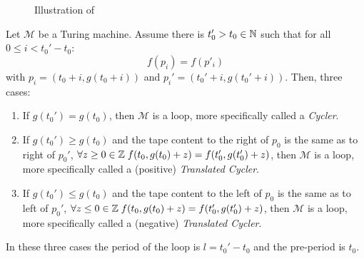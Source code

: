 \begin{figure}[h!]
\begin{minipage}[t]{0.5\textwidth}
{
        }
    \end{minipage}
    \caption{Illustration of}\label{fig:loop-proof}
\end{figure}

\begin{theorem} Let $\mathcal{M}$ be a Turing machine.
    Assume there is $t_0' > t_0 \in \mathbb{N}$ such that
    for all $0 \leq i < t_0'-t_0$: $$f(p_i) = f(p'_i)$$ with $p_i = (t_0+i, g(t_0+i))$ and $p_i' = (t_0'+i, g(t_0'+i))$. Then, three cases:
    \begin{enumerate}
        \item If $g(t_0') = g(t_0)$, then $\mathcal{M}$ is a loop, more specifically called a \textit{Cycler}.
        \item If $g(t_0') \geq g(t_0)$ and the tape content to the right of $p_0$ is the same as to right of $p_0'$, \ie $\forall z \geq 0 \in  \mathbb{Z} \; f(t_0,g(t_0)+z) = f(t_0',g(t_0')+z)$, then $\mathcal{M}$ is a loop, more specifically called a (positive) \textit{Translated Cycler}.
        \item If $g(t_0') \leq g(t_0)$ and the tape content to the left of $p_0$ is the same as to left of $p_0'$, \ie $\forall z \leq 0 \in \mathbb{Z} \; f(t_0,g(t_0)+z) = f(t_0',g(t_0')+z)$, then $\mathcal{M}$ is a loop, more specifically called a (negative) \textit{Translated Cycler}.
    \end{enumerate}
    In these three cases the period of the loop is $l = t_0' - t_0$ and the pre-period is $t_0$.
\end{theorem}

